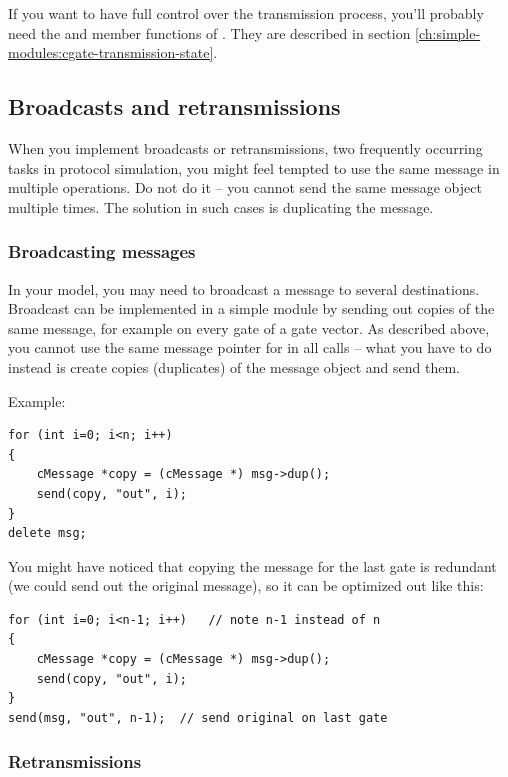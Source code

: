 If you want to have full control over the transmission process,
you'll probably need the  and 
member functions of . They are described in section
\ref{ch:simple-modules:cgate-transmission-state}.



\subsection{Broadcasts and retransmissions}

When you implement broadcasts or retransmissions, two frequently
occurring tasks in protocol simulation, you might feel tempted
to use the same message in multiple  operations.
Do not do it -- you cannot send the same message object multiple times.
The solution in such cases is duplicating the message.

\subsubsection{Broadcasting messages}

In your model, you may need to broadcast a message to several destinations.
Broadcast can be implemented in a simple module by sending out copies
of the same message, for example on every gate of a gate vector.
As described above, you cannot use the same message pointer for
in all  calls -- what you have to do instead is
create copies (duplicates) of the message object and send them.

Example:

\begin{verbatim}
for (int i=0; i<n; i++)
{
    cMessage *copy = (cMessage *) msg->dup();
    send(copy, "out", i);
}
delete msg;
\end{verbatim}

You might have noticed that copying the message for the last gate is
redundant (we could send out the original message),
so it can be optimized out like this:

\begin{verbatim}
for (int i=0; i<n-1; i++)   // note n-1 instead of n
{
    cMessage *copy = (cMessage *) msg->dup();
    send(copy, "out", i);
}
send(msg, "out", n-1);  // send original on last gate
\end{verbatim}


\subsubsection{Retransmissions}

